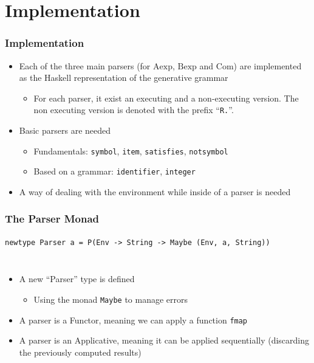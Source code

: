 \documentclass{beamer}
\begin{document}
\section{Implementation}
\begin{frame}
	\frametitle{Implementation}
	\begin{itemize}
		\item Each of the three main parsers (for $\mathrm{Aexp}$, $\mathrm{Bexp}$ and $\mathrm{Com}$) are
			implemented as the Haskell representation of the generative grammar
			\begin{itemize}
				\item For each parser, it exist an executing and a
					non-executing version. The non executing version is denoted
					with the prefix ``\texttt{R.}''.
			\end{itemize}
		\item Basic parsers are needed
		\begin{itemize}
			\item Fundamentals: \texttt{symbol}, \texttt{item},
				\texttt{satisfies}, \texttt{notsymbol}
			\item Based on a grammar: \texttt{identifier}, \texttt{integer}
		\end{itemize}
		\item A way of dealing with the environment while inside of a parser is needed
	\end{itemize}
\end{frame}

\begin{frame}
	\frametitle{The Parser Monad}
	\begin{center}
		\lstinline{newtype Parser a = P(Env -> String -> Maybe (Env, a, String))}
	\end{center}
	\begin{columns}
		\footnotesize
		\begin{itemize}
			\item A new ``Parser'' type is defined
				\begin{itemize}
					\footnotesize
					\item Using the monad \lstinline|Maybe| to manage errors
				\end{itemize}
			\item A parser is a Functor, meaning we can apply a function
				\texttt{fmap}
			\item A parser is an Applicative, meaning it can be applied
				sequentially (discarding the previously computed results)
		\end{itemize}
		
		
	\end{columns}
\end{frame}
\end{document}
